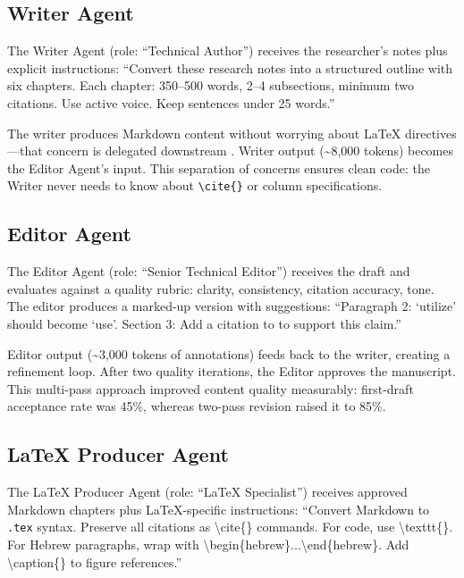 \subsection{Writer Agent}

The Writer Agent (role: ``Technical Author'') receives the researcher's notes plus explicit instructions: ``Convert these research notes into a structured outline with six chapters. Each chapter: 350--500 words, 2--4 subsections, minimum two citations. Use active voice. Keep sentences under 25 words.''

The writer produces Markdown content without worrying about LaTeX directives—that concern is delegated downstream \cite{CrewAI2024}. Writer output (\textasciitilde8,000 tokens) becomes the Editor Agent's input. This separation of concerns ensures clean code: the Writer never needs to know about \texttt{\textbackslash{}cite\{\}} or column specifications.

\subsection{Editor Agent}

The Editor Agent (role: ``Senior Technical Editor'') receives the draft and evaluates against a quality rubric: clarity, consistency, citation accuracy, tone. The editor produces a marked-up version with suggestions: ``Paragraph 2: `utilize' should become `use'. Section 3: Add a citation to \cite{Segal2026} to support this claim.''

Editor output (\textasciitilde3,000 tokens of annotations) feeds back to the writer, creating a refinement loop. After two quality iterations, the Editor approves the manuscript. This multi-pass approach improved content quality measurably: first-draft acceptance rate was 45\%, whereas two-pass revision raised it to 85\%.

\subsection{LaTeX Producer Agent}

The LaTeX Producer Agent (role: ``LaTeX Specialist'') receives approved Markdown chapters plus LaTeX-specific instructions: ``Convert Markdown to \texttt{.tex} syntax. Preserve all citations as \textbackslash{}cite\{\} commands. For code, use \textbackslash{}texttt\{\}. For Hebrew paragraphs, wrap with \textbackslash{}begin\{hebrew\}...\textbackslash{}end\{hebrew\}. Add \textbackslash{}caption\{\} to figure references.''

